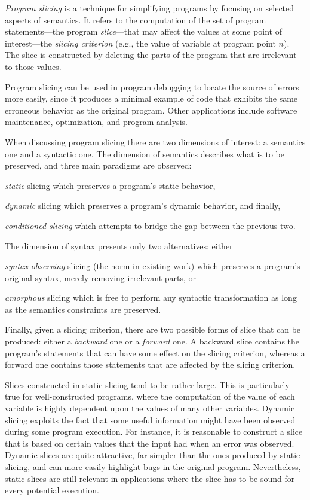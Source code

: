 \emph{Program slicing} is a technique for simplifying programs by focusing on selected aspects of semantics. It refers to the computation of the set of program statements---the program \emph{slice}---that may affect the values at some point of interest---the \emph{slicing criterion} (e.g., the value of variable  at program point $n$). The slice is constructed by deleting the parts of the program that are irrelevant to those values. 

Program slicing can be used in program debugging to locate the source of errors more easily, since it produces a minimal example of code that exhibits the same erroneous behavior as the original program. Other applications include software maintenance, optimization, and program analysis.

When discussing program slicing there are two dimensions of interest: a semantics one and a syntactic one. The dimension of semantics describes what is to be preserved, and three main paradigms are observed:
\begin{inparaenum}[(1)]
\item \emph{static} slicing which preserves a program's static behavior,
\item \emph{dynamic} slicing which preserves a program's dynamic behavior, and finally,
\item \emph{conditioned slicing} which attempts to bridge the gap between the previous two.
\end{inparaenum}

The dimension of syntax presents only two alternatives: either 
\begin{inparaenum}[(1)]
\item \emph{syntax-observing} slicing (the norm in existing work) which preserves a program's original syntax, merely removing irrelevant parts, or
\item \emph{amorphous} slicing which is free to perform any syntactic transformation as long as the semantics constraints are preserved.
\end{inparaenum}

Finally, given a slicing criterion, there are two possible forms of slice that can be produced: either a \emph{backward} one or a \emph{forward} one. A backward slice contains the program's statements that can have some effect on the slicing criterion, whereas a forward one contains those statements that are affected by the slicing criterion.

Slices constructed in static slicing tend to be rather large. This is particularly true for well-constructed programs, where the computation of the value of each variable is highly dependent upon the values of many other variables. Dynamic slicing exploits the fact that some useful information might have been observed during some program execution. For instance, it is reasonable to construct a slice that is based on certain values that the input had when an error was observed. Dynamic slices are quite attractive, far simpler than the ones produced by static slicing, and can more easily highlight bugs in the original program. Nevertheless, static slices are still relevant in applications where the slice has to be sound for every potential execution.

